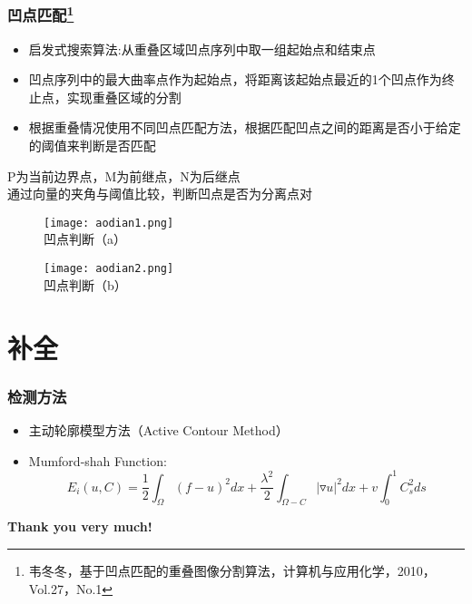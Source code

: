 \documentclass[notheorems,mathserif,table,compress]{beamer}  %
\begin{document}
\begin{frame}
    \frametitle{凹点匹配\footnote{韦冬冬，基于凹点匹配的重叠图像分割算法，计算机与应用化学，2010，Vol.27，No.1}}
    \begin{itemize}
	\item 启发式搜索算法:从重叠区域凹点序列中取一组起始点和结束点
	\item 凹点序列中的最大曲率点作为起始点，将距离该起始点最近的1个凹点作为终止点，实现重叠区域的分割
	\item 根据重叠情况使用不同凹点匹配方法，根据匹配凹点之间的距离是否小于给定的阈值来判断是否匹配
    \end{itemize}
\end{frame}

\begin{frame}
    P为当前边界点，M为前继点，N为后继点\\
    通过向量的夹角与阈值比较，判断凹点是否为分离点对
     \begin{figure}
     \begin{minipage}[b]{0.5\textwidth} 
     \centering 
     \texttt{[image: aodian1.png]} \\
     凹点判断（a）
   \end{minipage}
   \begin{minipage}[b]{0.5\textwidth} 
     \centering 
     \texttt{[image: aodian2.png]} \\
     凹点判断（b）
   \end{minipage}
   \end{figure}
\end{frame}

\section{补全}
\begin{frame}
    \frametitle{检测方法}
    \begin{itemize}
	\item 主动轮廓模型方法（Active Contour Method）
	\item Mumford-shah Function: \newline
	\begin{displaymath}
	E_i(u,C)=\frac{1}{2} \int_{\Omega} (f-u)^2 dx + 
        \frac{\lambda^2}{2} \int_{\Omega-C} \lvert \triangledown u\rvert ^2 dx +
	v \int_{0}^{1} C_s^2 ds 
	\end{displaymath}
    \end{itemize}
\end{frame}

\begin{frame}
   \begin{Huge}
   \textbf{Thank you very much!}
   \end{Huge}
\end{frame}
\end{document}
